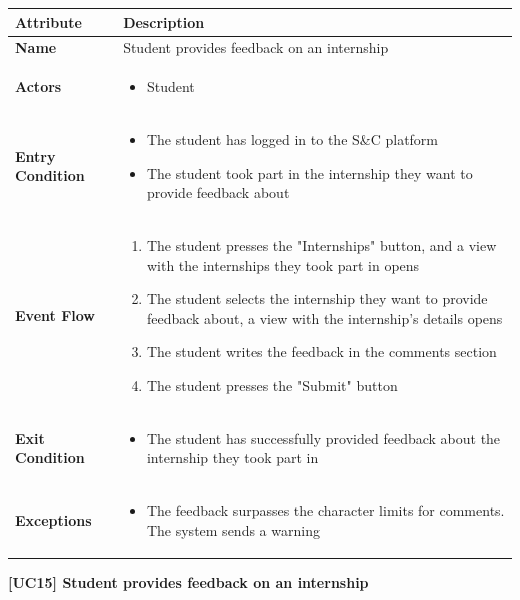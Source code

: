 \begin{center}
    
    \begin{tabular}{|p{3cm}|p{9cm}|}
    \hline
    \textbf{Attribute} & \textbf{Description} \\ \hline
    \textbf{Name} & Student provides feedback on an internship \\ \hline
    \textbf{Actors} & 
    \begin{itemize}
        \item Student
    \end{itemize} \\ \hline
    \textbf{Entry Condition} & 
    \begin{itemize}
        \item The student has logged in to the S\&C platform
        \item The student took part in the internship they want to provide feedback about
    \end{itemize}\\ \hline
    \textbf{Event Flow} & 
    \begin{enumerate}
        \item The student presses the "Internships" button, and a view with the internships they took part in opens
        \item The student selects the internship they want to provide feedback about, a view with the internship's details opens
        \item The student writes the feedback in the comments section
        \item The student presses the "Submit" button
    \end{enumerate} \\ \hline
    \textbf{Exit Condition} & 
    \begin{itemize}
        \item The student has successfully provided feedback about the internship they took part in
    \end{itemize}\\ \hline
    \textbf{Exceptions} & 
    \begin{itemize}
        \item The feedback surpasses the character limits for comments. The system sends a warning
    \end{itemize}
    \\ \hline
    \end{tabular}
    \newline
    \newline
    \textbf{[UC15] Student provides feedback on an internship}
    \newline
    \newline
    

\end{center}
